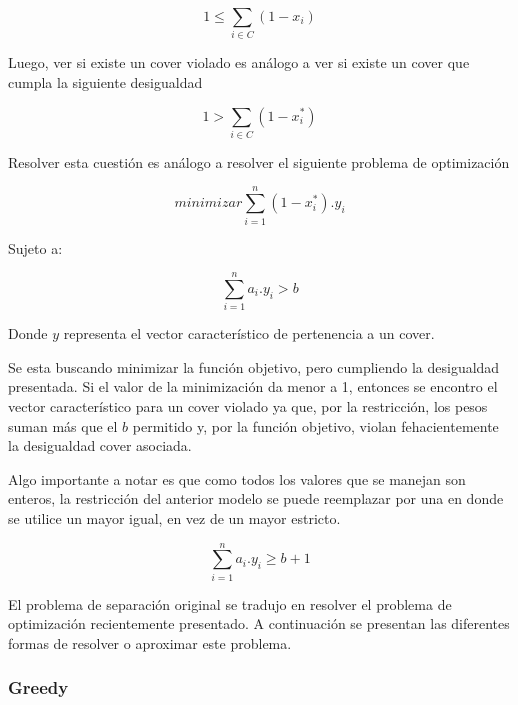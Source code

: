 \begin{equation}
1 \leq \sum\limits_{i \in C}(1 - x_i)
\end{equation}


Luego, ver si existe un cover violado es an\'alogo a ver si existe un cover que cumpla la siguiente desigualdad

\begin{equation}
1 > \sum\limits_{i \in C} (1 - x_i^*)
\end{equation}

Resolver esta cuesti\'on es an\'alogo a resolver el siguiente problema de optimizaci\'on

\begin{equation}
minimizar \sum\limits_{i=1}^n(1-x_i^*).y_i
\end{equation}

Sujeto a:

\begin{equation}
\sum\limits_{i=1}^n a_i . y_i > b
\end{equation}


Donde $y$ representa el vector caracter\'istico de pertenencia a un cover.

Se esta buscando minimizar la funci\'on objetivo, pero cumpliendo la desigualdad presentada. Si el valor de la minimizaci\'on da menor a 1, entonces se encontro el vector caracter\'istico para un cover violado ya que, por la restricci\'on, los pesos suman m\'as que el $b$ permitido y, por la funci\'on objetivo, violan fehacientemente la desigualdad cover asociada.


\medskip

Algo importante a notar es que como todos los valores que se manejan son enteros, la restricci\'on del anterior modelo se puede reemplazar por una en donde se utilice un mayor igual, en vez de un mayor estricto.

\begin{equation}
\sum\limits_{i=1}^n a_i . y_i \geq b + 1
\end{equation}




El problema de separaci\'on original se tradujo en resolver el problema de optimizaci\'on recientemente presentado. A continuaci\'on se presentan las diferentes formas de resolver o aproximar este problema.

\bigskip
\subsubsection{Greedy}

